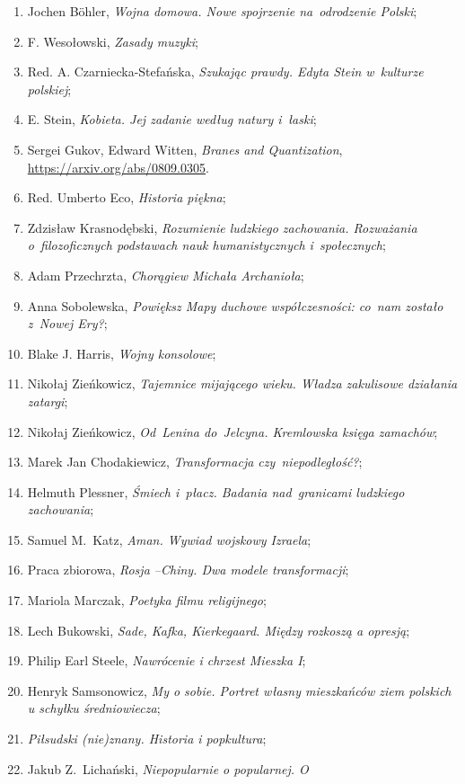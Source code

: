 \documentclass[a4paper,11pt]{article}
\begin{document}
\begin{enumerate}
{    koncentracyjne od 1896 do dziś. Analiza};
\item Jochen B\"{o}hler, \emph{Wojna domowa. Nowe spojrzenie
    na~odrodzenie Polski};
\item F. Wesołowski, \emph{Zasady muzyki};
\item Red. A. Czarniecka-Stefańska, \emph{Szukając prawdy. Edyta Stein
    w~kulturze polskiej};
\item E. Stein, \emph{Kobieta. Jej zadanie według natury i~łaski};
\item Sergei Gukov, Edward Witten, \emph{Branes and Quantization},
  \href{https://arxiv.org/abs/0809.0305}{https://arxiv.org/abs/0809.0305}.
\item Red. Umberto Eco, \emph{Historia piękna};
\item Zdzisław Krasnodębski, \emph{Rozumienie ludzkiego zachowania.
    Rozważania o~filozoficznych podstawach nauk humanistycznych
    i~społecznych};
\item Adam Przechrzta, \emph{Chorągiew Michała Archanioła};
\item Anna Sobolewska, \emph{Powiększ Mapy duchowe współczesności:
    co~nam zostało z~Nowej Ery?};
\item Blake J. Harris, \emph{Wojny konsolowe};
\item Nikołaj Zieńkowicz, \emph{Tajemnice mijającego wieku. Władza
    zakulisowe działania zatargi};
\item Nikołaj Zieńkowicz, \emph{Od~Lenina do~Jelcyna. Kremlowska
    księga zamachów};
\item Marek Jan Chodakiewicz, \emph{Transformacja czy~niepodległość?};
\item Helmuth Plessner, \emph{Śmiech i~płacz. Badania nad~granicami
    ludzkiego zachowania};
\item Samuel M.~Katz, \emph{Aman. Wywiad wojskowy Izraela};
\item Praca zbiorowa, \emph{Rosja --Chiny. Dwa modele transformacji};
\item Mariola Marczak, \emph{Poetyka filmu religijnego};
\item Lech Bukowski, \emph{Sade, Kafka, Kierkegaard. Między rozkoszą a
    opresją};
\item Philip Earl Steele, \emph{Nawrócenie i chrzest Mieszka I};
\item Henryk Samsonowicz, \emph{My o sobie. Portret własny mieszkańców
    ziem polskich u schyłku średniowiecza};
\item \emph{Piłsudski (nie)znany. Historia i popkultura};
\item Jakub Z.~Lichański, \emph{Niepopularnie o popularnej. O
}
\end{enumerate}
\end{document}
